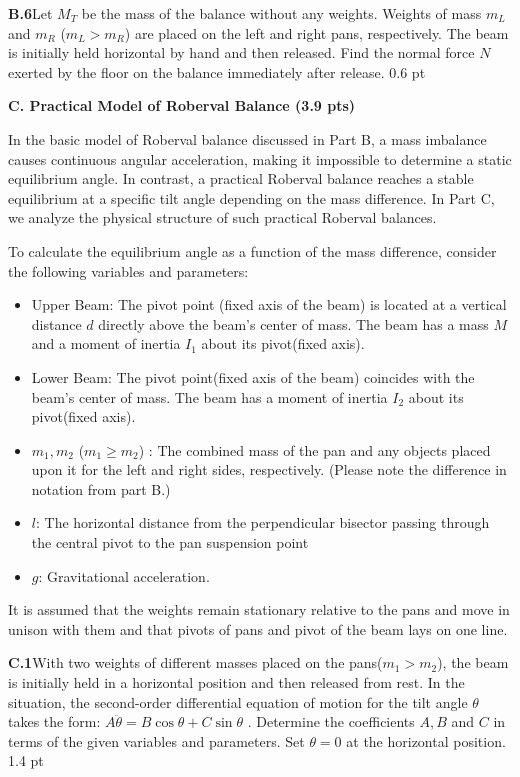 \textbf{B.6}\quad Let $M_T$ be the mass of the balance without any weights.
Weights of mass $m_L$ and $m_R$ ($m_L > m_R$) are placed on the left and right
pans, respectively. The beam is initially held horizontal by hand and then
released. Find the normal force $N$ exerted by the floor on the balance
immediately after release. \hfill 0.6 pt

\textbf{C. Practical Model of Roberval Balance (3.9 pts)}

In the basic model of Roberval balance discussed in Part B, a mass imbalance
causes continuous angular acceleration, making it impossible to determine a
static equilibrium angle. In contrast, a practical Roberval balance reaches a
stable equilibrium at a specific tilt angle depending on the mass difference.
In Part C, we analyze the physical structure of such practical Roberval
balances.

To calculate the equilibrium angle as a function of the mass difference,
consider the following variables and parameters:

\begin{itemize}
\item Upper Beam: The pivot point (fixed axis of the beam) is located at a
vertical distance $d$ directly above the beam's center of mass. The beam has a
mass $M$ and a moment of inertia $I_1$ about its pivot(fixed axis).
\item Lower Beam: The pivot point(fixed axis of the beam) coincides with the
beam's center of mass. The beam has a moment of inertia $I_2$ about its
pivot(fixed axis).
\item $m_1, m_2$ ($m_1 \geq m_2$) : The combined mass of the pan and any objects
placed upon it for the left and right sides, respectively. (Please note the
difference in notation from part B.)
\item $l$: The horizontal distance from the perpendicular bisector passing
through the central pivot to the pan suspension point
\item $g$: Gravitational acceleration.
\end{itemize}

It is assumed that the weights remain stationary relative to the pans and move
in unison with them and that pivots of pans and pivot of the beam lays on one
line.

\textbf{C.1}\quad With two weights of different masses placed on the
pans($m_1 > m_2$), the beam is initially held in a horizontal position and then
released from rest. In the situation, the second-order differential equation of
motion for the tilt angle $\theta$ takes the form:
$A\ddot{\theta} = B\cos\theta + C\sin\theta$ . Determine the coefficients
$A, B$ and $C$ in terms of the given variables and parameters. Set
$\theta = 0$ at the horizontal position. \hfill 1.4 pt

